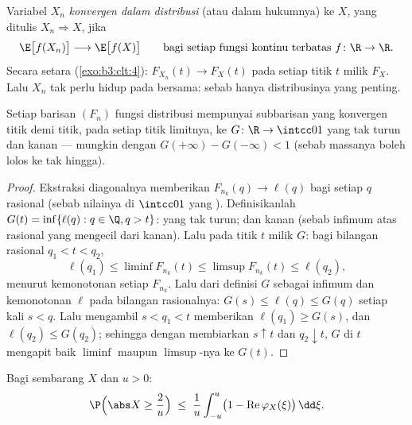\begin{definition}\label{def:b3:clt:cid}
Variabel $X_n$ \emph{konvergen dalam distribusi} (atau dalam hukumnya) ke $X$,
yang ditulis $X_n \Rightarrow X$, jika
\[
\E\bigl[f(X_n)\bigr] \longrightarrow \E\bigl[f(X)\bigr]
\qquad\text{bagi setiap fungsi kontinu terbatas } f\colon\R\to\R .
\]
Secara setara (\cref{exo:b3:clt:4}): $F_{X_n}(t) \to F_X(t)$
pada setiap titik  $t$ milik $F_X$. Lalu $X_n$ tak perlu
hidup pada  bersama: sebab hanya distribusinya yang penting.
\end{definition}

\begin{theorem}
\label{thm:b3:clt:helly}
Setiap barisan $(F_n)$ fungsi distribusi mempunyai
subbarisan yang konvergen titik demi titik, pada setiap titik 
limitnya, ke $G \colon \R \to \intcc01$ yang tak turun dan 
kanan --- mungkin dengan $G(+\infty) - G(-\infty) <
1$ (sebab massanya boleh lolos ke tak hingga).
\end{theorem}

\begin{proof}
Ekstraksi diagonalnya memberikan $F_{n_k}(q) \to \ell(q)$ bagi setiap
$q$ rasional (sebab nilainya di $\intcc01$ yang ). Definisikanlah
$G(t) = \inf\{\ell(q) : q \in \Q, q > t\}$: yang tak turun;
dan  kanan (sebab infimum atas  rasional yang
mengecil dari kanan). Lalu pada titik  $t$ milik
$G$: bagi bilangan rasional $q_1 < t < q_2$,
\[
\ell(q_1) \leq \liminf F_{n_k}(t) \leq \limsup F_{n_k}(t)
\leq \ell(q_2),
\]
menurut kemonotonan setiap $F_{n_k}$. Lalu dari definisi
$G$ sebagai infimum dan kemonotonan $\ell$ pada
bilangan rasionalnya: $G(s) \leq \ell(q) \leq G(q)$ setiap kali $s < q$.
Lalu mengambil $s < q_1 < t$ memberikan $\ell(q_1) \geq G(s)$, dan
$\ell(q_2) \leq G(q_2)$; sehingga dengan membiarkan $s \uparrow t$ dan $q_2
\downarrow t$,  $G$ di $t$ mengapit baik
$\liminf$ maupun $\limsup$-nya ke $G(t)$.
\end{proof}

\begin{lemma}
\label{lem:b3:clt:tightness}
Bagi sembarang  $X$ dan $u > 0$:
\[
\P\Bigl(\abs X \geq \frac2u\Bigr) \;\leq\;
\frac1u\int_{-u}^{u}\bigl(1 -
\operatorname{Re}\varphi_X(\xi)\bigr)\,\dd\xi .
\]
\end{lemma}


